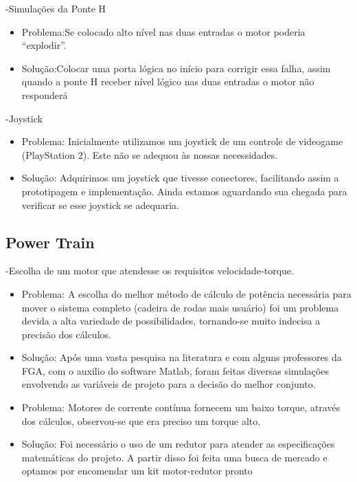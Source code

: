 -Simulações da Ponte H
 \begin{itemize}
      \item Problema:Se colocado alto nível nas duas entradas o motor poderia “explodir”.

	  \item Solução:Colocar uma porta lógica no início para corrigir essa falha, assim quando a ponte H receber nível lógico nas duas entradas o motor não responderá

    \end{itemize}

-Joystick
 \begin{itemize}
  \item Problema: Inicialmente utilizamos um joystick de um controle de videogame (PlayStation 2). Este não se adequou às nossas necessidades.
  \item Solução: Adquirimos um joystick que tivesse conectores, facilitando assim a prototipagem e implementação. Ainda estamos aguardando sua chegada para verificar se esse joystick se adequaria.

 \end{itemize}

\subsection{Power Train}

-Escolha de um motor que atendesse os requisitos velocidade-torque.
 \begin{itemize}
  \item Problema: A escolha do melhor método de cálculo de potência necessária para mover o sistema completo (cadeira de rodas mais usuário) foi um problema devida a alta variedade de possibilidades, tornando-se muito indecisa a precisão dos cálculos.
  \item Solução: Após uma vasta pesquisa na literatura e com alguns professores da FGA, com o auxilio do software Matlab, foram feitas diversas simulações envolvendo as variáveis de projeto para a decisão do melhor conjunto.

  \item Problema: Motores de corrente contínua fornecem um baixo torque, através dos cálculos, observou-se que era preciso um torque alto.
  \item Solução: Foi necessário o uso de um redutor para atender as especificações matemáticas do projeto. A partir disso foi feita uma busca de mercado e optamos por encomendar um kit motor-redutor pronto

 \end{itemize}

